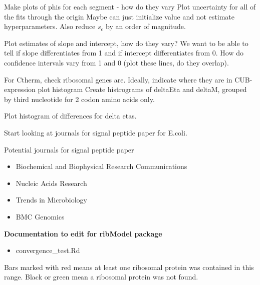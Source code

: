 \documentclass[11pt]{labbook}
\begin{document}
Make plots of phis for each segment - how do they vary
Plot uncertainty for all of the fits through the origin
Maybe can just initialize value and not estimate hyperparameters. Also reduce $s_\epsilon$ by an order of magnitude. 

Plot estimates of slope and intercept, how do they vary? We want to be able to tell if slope differentiates from 1 and if intercept differentiates from 0. How do confidence intervals vary from 1 and 0 (plot these lines, do they overlap). 

For Ctherm, check ribosomal genes are. Ideally, indicate where they are in CUB-expression plot histogram
Create histrograms of deltaEta and deltaM, grouped by third nucleotide for 2 codon amino acids only.  

Plot histogram of differences for delta etas. 

Start looking at journals for signal peptide paper for E.coli.  

Potential journals for signal peptide paper
\begin{itemize}
	\item Biochemical and Biophysical Research Communications
	\item Nucleic Acids Research
	\item Trends in Microbiology
	\item BMC Genomics
\end{itemize}


\textbf{Documentation to edit for ribModel package}
\begin{itemize}
	\item convergence\_test.Rd
\end{itemize}








Bars marked with red means at least one ribosomal protein was contained in this range. Black or green mean a ribosomal protein was not found.
\end{document}
